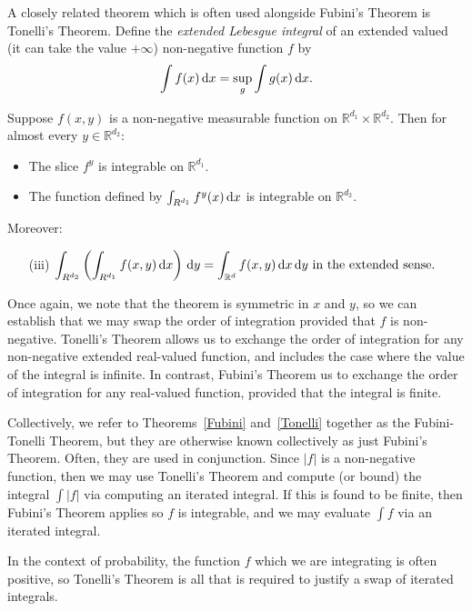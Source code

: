 A closely related theorem which is often used alongside Fubini's Theorem is Tonelli's Theorem. Define the \emph{extended Lebesgue integral} of an extended valued (it can take the value \(+\infty\)) non-negative function \(f\) by 
\[\int f(x)\, \mathrm{d} x = \sup_{g}\int g(x)\, \mathrm{d} x.\]
\begin{thm}\label{Tonelli}
	Suppose \(f(x,y)\) is a non-negative measurable function on \(\mathbb R^{d_1}\times \mathbb R^{d_2}\). Then for almost every \(y\in\mathbb R^{d_2}\):
	\begin{itemize}
		\item The slice \(f^y\) is integrable on \(\mathbb R^{d_1}\).
		\item The function defined by \(\int_{R^{d_1}} f^y(x)\, \mathrm{d} x\) is integrable on \(\mathbb R^{d_2}\). 
	\end{itemize}
	Moreover:
	\begin{itemize}
		\item[(iii)] \(\displaystyle\int_{R^{d_2}}\left(\int_{R^{d_1}}f(x,y)\, \mathrm{d} x\right)\, \mathrm{d} y = \int_{\mathbb R^d}f(x,y)\, \mathrm{d} x\, \mathrm{d} y \mbox{ in the extended sense}.\)
	\end{itemize}
\end{thm}

Once again, we note that the theorem is symmetric in \(x\) and \(y\), so we can establish that we may swap the order of integration provided that \(f\) is non-negative. Tonelli's Theorem allows us to exchange the order of integration for any non-negative extended real-valued function, and includes the case where the value of the integral is infinite. In contrast, Fubini's Theorem us to exchange the order of integration for any real-valued function, provided that the integral is finite. 

Collectively, we refer to Theorems~\ref{Fubini} and~\ref{Tonelli} together as the Fubini-Tonelli Theorem, but they are otherwise known collectively as just Fubini's Theorem. Often, they are used in conjunction. Since \(|f|\) is a non-negative function, then we may use Tonelli's Theorem and compute (or bound) the integral \(\int |f|\) via computing an iterated integral. If this is found to be finite, then Fubini's Theorem applies so \(f\) is integrable, and we may evaluate \(\int f\) via an iterated integral. 

In the context of probability, the function \(f\) which we are integrating is often positive, so Tonelli's Theorem is all that is required to justify a swap of iterated integrals. 

